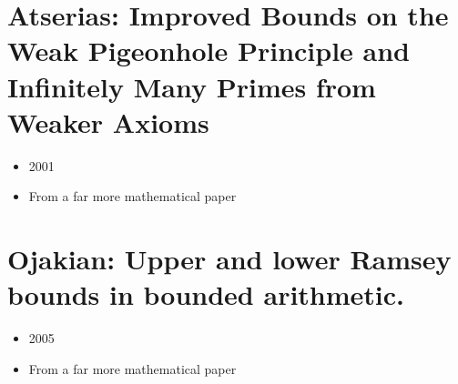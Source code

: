 \documentclass{report}
\begin{document}
\section{Atserias: Improved Bounds on the Weak Pigeonhole Principle and Infinitely Many Primes from Weaker Axioms}
\label{sec:AtseriasImprovedBounds}
\begin{itemize}
  \item 2001
  \item From a far more mathematical paper
\end{itemize}
\cite{AtseriasImprovedBounds}


\section{Ojakian: Upper and lower Ramsey bounds in bounded arithmetic.}
\label{sec:Ojakian05UpperLower}
\begin{itemize}
  \item 2005
  \item From a far more mathematical paper
\end{itemize}
\cite{Ojakian05UpperLower}




\end{document}
